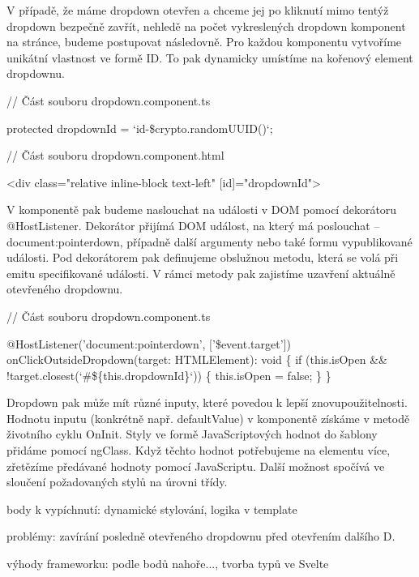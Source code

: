 V případě, že máme dropdown otevřen a chceme jej po kliknutí mimo tentýž dropdown bezpečně zavřít, nehledě na počet vykreslených dropdown komponent na stránce, budeme postupovat následovně. 
Pro každou komponentu vytvoříme unikátní vlastnost ve formě ID. To pak dynamicky umístíme na kořenový element dropdownu.

\begin{prog}
// Část souboru dropdown.component.ts

protected dropdownId = `id-\${crypto.randomUUID()}`;

// Část souboru dropdown.component.html

<div class="relative inline-block text-left" [id]="dropdownId">
\end{prog}

V komponentě pak budeme naslouchat na události v DOM pomocí dekorátoru @HostListener. 
Dekorátor přijímá DOM událost, na který má poslouchat -- document:pointerdown, případně další argumenty nebo také formu vypublikované události. 
Pod dekorátorem pak definujeme obslužnou metodu, která se volá při emitu specifikované události. V rámci metody pak zajistíme uzavření aktuálně otevřeného dropdownu.

\begin{prog}
// Část souboru dropdown.component.ts

@HostListener('document:pointerdown', ['\$event.target'])
onClickOutsideDropdown(target: HTMLElement): void \{
  if (this.isOpen && !target.closest(`#\$\{this.dropdownId\}`)) \{
    this.isOpen = false;
  \}
\}
\end{prog}

Dropdown pak může mít různé inputy, které povedou k lepší znovupoužitelnosti. Hodnotu inputu (konkrétně např. defaultValue) v komponentě získáme v metodě životního cyklu OnInit. 
Styly ve formě JavaScriptových hodnot do šablony přidáme pomocí ngClass. Když těchto hodnot potřebujeme na elementu více, zřetězíme předávané hodnoty pomocí JavaScriptu. 
Další možnost spočívá ve sloučení požadovaných stylů na úrovni třídy.

\begin{citemize}
	\item body k vypíchnutí: dynamické stylování, logika v template
	\item problémy: zavírání posledně otevřeného dropdownu před otevřením dalšího D.
	\item výhody frameworku: podle bodů nahoře..., tvorba typů ve Svelte
\end{citemize}

